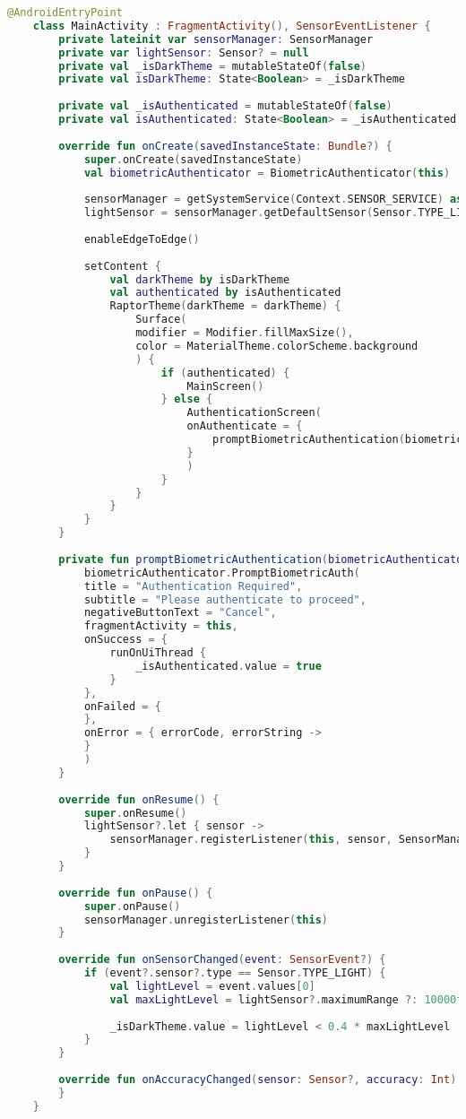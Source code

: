 \begin{lstlisting}[caption=Implementacja czujnika światłą w \texttt{MainActivity.kt}, label={lst:LightSensorMain}, language=kotlin]
	@AndroidEntryPoint
	class MainActivity : FragmentActivity(), SensorEventListener {
		private lateinit var sensorManager: SensorManager
		private var lightSensor: Sensor? = null
		private val _isDarkTheme = mutableStateOf(false)
		private val isDarkTheme: State<Boolean> = _isDarkTheme
		
		private val _isAuthenticated = mutableStateOf(false)
		private val isAuthenticated: State<Boolean> = _isAuthenticated
		
		override fun onCreate(savedInstanceState: Bundle?) {
			super.onCreate(savedInstanceState)
			val biometricAuthenticator = BiometricAuthenticator(this)
			
			sensorManager = getSystemService(Context.SENSOR_SERVICE) as SensorManager
			lightSensor = sensorManager.getDefaultSensor(Sensor.TYPE_LIGHT)
			
			enableEdgeToEdge()
			
			setContent {
				val darkTheme by isDarkTheme
				val authenticated by isAuthenticated
				RaptorTheme(darkTheme = darkTheme) {
					Surface(
					modifier = Modifier.fillMaxSize(),
					color = MaterialTheme.colorScheme.background
					) {
						if (authenticated) {
							MainScreen()
						} else {
							AuthenticationScreen(
							onAuthenticate = {
								promptBiometricAuthentication(biometricAuthenticator)
							}
							)
						}
					}
				}
			}
		}
		
		private fun promptBiometricAuthentication(biometricAuthenticator: BiometricAuthenticator) {
			biometricAuthenticator.PromptBiometricAuth(
			title = "Authentication Required",
			subtitle = "Please authenticate to proceed",
			negativeButtonText = "Cancel",
			fragmentActivity = this,
			onSuccess = {
				runOnUiThread {
					_isAuthenticated.value = true
				}
			},
			onFailed = {
			},
			onError = { errorCode, errorString ->
			}
			)
		}
		
		override fun onResume() {
			super.onResume()
			lightSensor?.let { sensor ->
				sensorManager.registerListener(this, sensor, SensorManager.SENSOR_DELAY_NORMAL)
			}
		}
		
		override fun onPause() {
			super.onPause()
			sensorManager.unregisterListener(this)
		}
		
		override fun onSensorChanged(event: SensorEvent?) {
			if (event?.sensor?.type == Sensor.TYPE_LIGHT) {
				val lightLevel = event.values[0]
				val maxLightLevel = lightSensor?.maximumRange ?: 10000f
				
				_isDarkTheme.value = lightLevel < 0.4 * maxLightLevel
			}
		}
		
		override fun onAccuracyChanged(sensor: Sensor?, accuracy: Int) {
		}
	}
\end{lstlisting}

